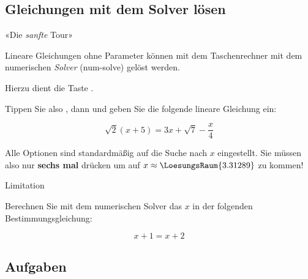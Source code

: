 
\subsection{Gleichungen mit dem Solver lösen}

«Die \textit{sanfte} Tour»

Lineare Gleichungen ohne Parameter können mit dem Taschenrechner mit dem numerischen
\textit{Solver} (num-solve) gelöst werden.

  Hierzu dient die Taste .

  Tippen Sie also , dann  und geben
  Sie die folgende lineare Gleichung ein:

$$\sqrt{2}(x+5) = 3x + \sqrt{7} - \frac{x}4$$

  Alle Optionen sind standardmäßig auf die Suche nach $x$
  eingestellt. Sie müssen also nur \textbf{sechs mal} 
  drücken um auf $x\approx \LoesungsRaum{3.31289}$ zu kommen!

  \begin{bemerkung}{Limitation}{}

    Berechnen Sie mit dem numerischen Solver
     das $x$ in der folgenden
    Bestimmungsgleichung:

    $$x+1=x+2$$
    

    \vspace{10mm}
    
    
  \end{bemerkung}
  \newpage
  
  \subsection*{Aufgaben}
\newpage
